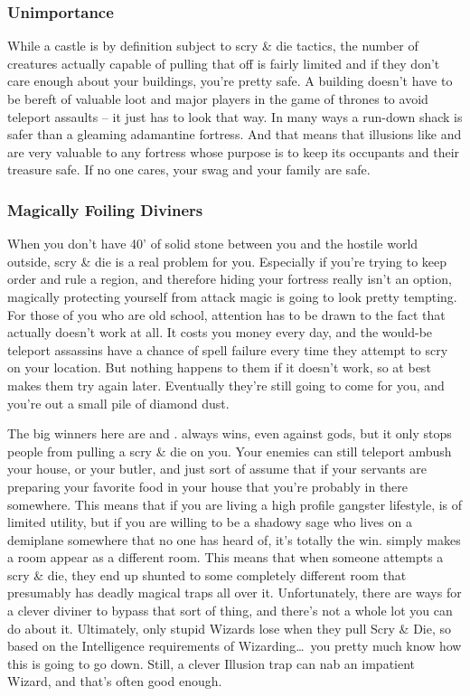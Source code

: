 \subsubsection{Unimportance}

While a castle is by definition subject to scry \& die tactics, the number of creatures actually capable of pulling that off is fairly limited and if they don't care enough about your buildings, you're pretty safe. A building doesn't have to be bereft of valuable loot and major players in the game of thrones to avoid teleport assaults -- it just has to look that way. In many ways a run-down shack is safer than a gleaming adamantine fortress. And that means that illusions like  and  are very valuable to any fortress whose purpose is to keep its occupants and their treasure safe. If no one cares, your swag and your family are safe.

\subsubsection{Magically Foiling Diviners}

When you don't have 40' of solid stone between you and the hostile world outside, scry \& die is a real problem for you. Especially if you're trying to keep order and rule a region, and therefore hiding your fortress really isn't an option, magically protecting yourself from attack magic is going to look pretty tempting. For those of you who are old school, attention has to be drawn to the fact that  actually doesn't work at all. It costs you money every day, and the would-be teleport assassins have a chance of spell failure every time they attempt to scry on your location. But nothing happens to them if it doesn't work, so at best  makes them try again later. Eventually they're still going to come for you, and you're out a small pile of diamond dust.

The big winners here are  and .  always wins, even against gods, but it only stops people from pulling a scry \& die on you. Your enemies can still teleport ambush your house, or your butler, and just sort of assume that if your servants are preparing your favorite food in your house that you're probably in there somewhere. This means that if you are living a high profile gangster lifestyle,  is of limited utility, but if you are willing to be a shadowy sage who lives on a demiplane somewhere that no one has heard of, it's totally the win.  simply makes a room appear as a different room. This means that when someone attempts a scry \& die, they end up shunted to some completely different room that presumably has deadly magical traps all over it. Unfortunately, there are ways for a clever diviner to bypass that sort of thing, and there's not a whole lot you can do about it. Ultimately, only stupid Wizards lose when they pull Scry \& Die, so based on the Intelligence requirements of Wizarding\ldots\  you pretty much know how this is going to go down. Still, a clever Illusion trap can nab an impatient Wizard, and that's often good enough.

